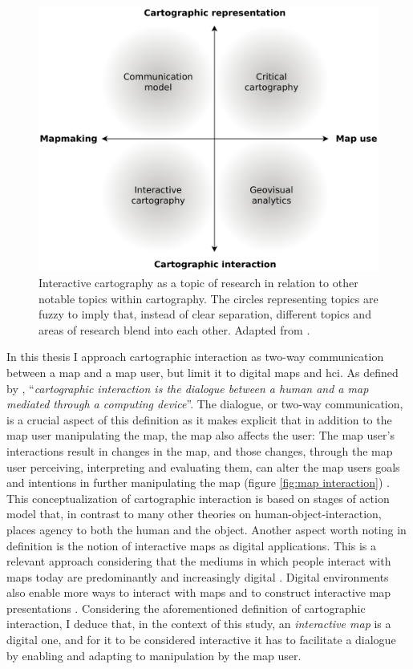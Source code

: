 \begin{figure}[H]
	\centering
	\includegraphics[width=\diagramwidth]{visual/figures/diagrams/cartography_topics.png}
	\caption{
		Interactive cartography as a topic of research
		in relation to other notable topics within cartography.
		The circles representing topics are fuzzy to imply that,
		instead of clear separation,
		different topics and areas of research blend into each other.
		Adapted from \textcite{rot2013b}.
	}
	\label{fig:cartography topics}
\end{figure}


In this thesis I approach cartographic interaction as
two-way communication between a map and a map user,
but limit it to digital maps and \acrshort{hci}.
As defined by \textcite[p.~14]{rot2011},
\enquote{\textit{cartographic interaction is the dialogue between a human and a map
mediated through a computing device}}.
The dialogue, or two-way communication, is a crucial aspect of this definition
as it makes explicit that in addition to the map user manipulating the map,
the map also affects the user:
The map user's interactions result in changes in the map,
and those changes, through the map user perceiving, interpreting and evaluating them,
can alter the map users goals and intentions
in further manipulating the map (figure \ref{fig:map interaction}) \parencite{rot2012}.
This conceptualization of cartographic interaction
is based on 
stages of action model that,
in contrast to many other theories on human-object-interaction,
places agency to both the human and the object.
Another aspect worth noting in  definition
is the notion of interactive maps as digital applications.
This is a relevant approach considering
that the mediums in which people interact with maps today
are predominantly and increasingly digital \parencite{mei2019}.
Digital environments also enable more ways to interact with maps
and to construct interactive map presentations \parencite{rot2013b, mei2019}.
Considering the aforementioned definition of cartographic interaction,
I deduce that, in the context of this study,
an \textit{interactive map} is a digital one,
and for it to be considered interactive it has to
facilitate a dialogue by enabling and adapting to manipulation by the map user.

